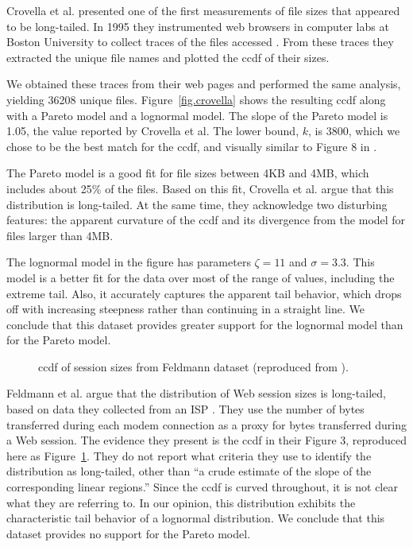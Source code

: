 \documentclass[10pt,twocolumn]{article}
\begin{document}
\label{webclient}

Crovella et al. presented one of the first measurements of file sizes
that appeared to be long-tailed.  In 1995 they instrumented web
browsers in computer labs at Boston University to collect traces of
the files accessed \cite{CunhaBestavrosCrovella95}
\cite{CrovellaBestavros96} \cite{CrovellaTaqquBestavros99}.  From
these traces they extracted the unique file names and plotted the ccdf
of their sizes.

We obtained these traces from their web pages and performed the same
analysis, yielding 36208 unique files.  Figure~\ref{fig.crovella}
shows the resulting ccdf along with a Pareto model and a lognormal
model.  The slope of the Pareto model is 1.05, the value reported by
Crovella et al.  The lower bound, $k$, is 3800, which we chose to be
the best match for the ccdf, and visually similar to Figure 8
in \cite{CrovellaBestavros96}.

The Pareto model is a good fit for file sizes between 4KB and 4MB,
which includes about 25\% of the files.
Based on this fit, Crovella et al. argue that this distribution is
long-tailed.  At the same time, they acknowledge two disturbing
features: the apparent curvature of the ccdf and its divergence from
the model for files larger than 4MB.

The lognormal model in the figure has parameters $\zeta = 11$ and
$\sigma = 3.3$.  This model is a better fit for the data over most of
the range of values, including the extreme tail.  Also, it accurately
captures the apparent tail behavior, which drops off with increasing
steepness rather than continuing in a straight line.
We conclude that this dataset provides greater support for the
lognormal model than for the Pareto model.

\begin{figure}[tb]
\centerline{}
\caption{ccdf of session sizes from Feldmann dataset
(reproduced from \cite{FeldmannGilbertWillingerKurtz98}).}
\label{fig.feldmann}
\end{figure}

Feldmann et al. argue that the distribution of Web session sizes is
long-tailed, based on data they collected from an ISP
\cite{FeldmannGilbertWillingerKurtz98}.  They use the number of bytes
transferred during each modem connection as a proxy for bytes
transferred during a Web session.  The evidence they present
is the ccdf in their Figure 3, reproduced
here as Figure~\ref{fig.feldmann}.  They do not report what criteria
they use to identify the distribution as long-tailed, other than ``a
crude estimate of the slope of the corresponding linear regions.''
Since the ccdf is curved throughout, it is not clear what they are
referring to.  In our opinion, this distribution exhibits the
characteristic tail behavior of a lognormal distribution.  We conclude
that this dataset provides no support for the Pareto model.
\end{document}
